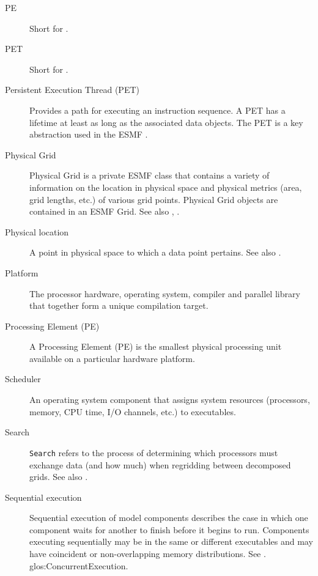 \begin{description}
\label{glos:PE} 
\item[PE] 
Short for .

\label{glos:PET} 
\item[PET] 
  Short for .

\label{glos:PermET} 
\item[Persistent Execution Thread (PET)] 
  Provides a
  path for executing an instruction sequence. A PET has a lifetime at least 
  as long as the associated data objects. The PET is a key abstraction 
  used in the ESMF .

\label{glos:PhysGrid} 
\item[Physical Grid] 
  Physical Grid is a private ESMF class that contains a variety of information on the location 
  in physical space and physical metrics (area, grid lengths, etc.) 
  of various grid points.  Physical Grid objects are contained in an 
  ESMF Grid.  See also , 
  .  

\label{glos:PhysLoc} 
\item[Physical location] 
  A point in physical space to which a data point pertains.  See also
  .   

\label{glos:Platform} 
\item[Platform] 
  The processor hardware, operating system, compiler and
  parallel library that together form a unique compilation target.

\label{glos:Processing_Element}
\item[Processing Element (PE)] 
  A Processing Element (PE) is the smallest physical processing unit available
  on a particular hardware platform.

\label{glos:Scheduler} 
\item[Scheduler] 
  An operating system component 
  that assigns system resources (processors, memory, CPU time, 
  I/O channels, etc.) to executables.

\label{glos:Search} 
\item[Search]
  {\tt Search} refers to the process of determining which processors must
  exchange data (and how much) when regridding between decomposed grids.
  See also .

\label{glos:SequentialExecution}
\item[Sequential execution] 
  Sequential execution of model components describes the case in which 
  one component waits for another to finish before it begins
  to run.  Components executing sequentially may be in the same or 
  different executables and may have coincident or non-overlapping 
  memory distributions.  See .
  {glos:ConcurrentExecution}.


\end{description}
